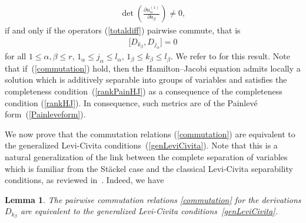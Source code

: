 \documentclass[11pt]{article}
\numberwithin{equation}{section}
\newtheorem{Lemma}[Theorem]{Lemma}
\newcommand{\jalpha}{j_{\alpha}}
\newcommand{\kbeta}{k_{\beta}}
\newcommand{\lbeta}{l_{\beta}}
\newcommand{\lalpha}{l_{\alpha}}
\begin{document}
\begin{gather}\label{rankHJ}
\det\left(\frac{\partial u^{(1)}_{\alpha}}{\partial a_{\beta}}\right)\neq 0,
\end{gather}
if and only if the operators (\ref{totaldiff}) pairwise commute, that is
\begin{gather}\label{commutation}
\big[D_{\kbeta},D_{\jalpha}\big]=0
\end{gather}
for all $1\leq \alpha, \beta \leq r$, $1_{\alpha}\leq \jalpha\leq \lalpha$, $1_{\beta}\leq \kbeta\leq \lbeta$. We refer to \cite[Theorem~2.1]{BCR1-2002} for this result. Note that if~(\ref{commutation}) hold, then the Hamilton--Jacobi equation admits locally a solution which is additively separable into groups of variables and satisfies the completeness condition~(\ref{rankPainHJ}) as a consequence of the completeness condition (\ref{rankHJ}). In consequence, such metrics are of the Painlev\'e form~(\ref{Painleveform}).

We now prove that the commutation relations (\ref{commutation}) are equivalent to the generalized Levi-Civita conditions~(\ref{genLeviCivita}). Note that this is a natural generalization of the link between the complete separation of variables which is familiar from the St\"ackel case and the classical Levi-Civita separability conditions, as reviewed in~\cite{BCR1-2002,KaMi1984}. Indeed, we have
\begin{Lemma}
The pairwise commutation relations \eqref{commutation} for the derivations $D_{\kbeta}$ are equivalent to the generalized Levi-Civita conditions~\eqref{genLeviCivita}.
\end{Lemma}
\end{document}

